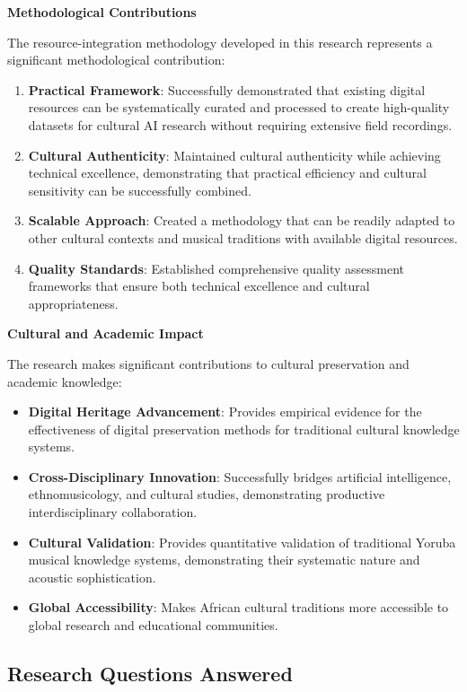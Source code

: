 \documentclass[12pt,a4paper]{article}
\begin{document}
\textbf{Methodological Contributions}

The resource-integration methodology developed in this research represents a significant methodological contribution:

\begin{enumerate}
\item \textbf{Practical Framework}: Successfully demonstrated that existing digital resources can be systematically curated and processed to create high-quality datasets for cultural AI research without requiring extensive field recordings.
\item \textbf{Cultural Authenticity}: Maintained cultural authenticity while achieving technical excellence, demonstrating that practical efficiency and cultural sensitivity can be successfully combined.
\item \textbf{Scalable Approach}: Created a methodology that can be readily adapted to other cultural contexts and musical traditions with available digital resources.
\item \textbf{Quality Standards}: Established comprehensive quality assessment frameworks that ensure both technical excellence and cultural appropriateness.
\end{enumerate}

\textbf{Cultural and Academic Impact}

The research makes significant contributions to cultural preservation and academic knowledge:

\begin{itemize}
\item \textbf{Digital Heritage Advancement}: Provides empirical evidence for the effectiveness of digital preservation methods for traditional cultural knowledge systems.
\item \textbf{Cross-Disciplinary Innovation}: Successfully bridges artificial intelligence, ethnomusicology, and cultural studies, demonstrating productive interdisciplinary collaboration.
\item \textbf{Cultural Validation}: Provides quantitative validation of traditional Yoruba musical knowledge systems, demonstrating their systematic nature and acoustic sophistication.
\item \textbf{Global Accessibility}: Makes African cultural traditions more accessible to global research and educational communities.
\end{itemize}

\subsection{Research Questions Answered}
\end{document}
